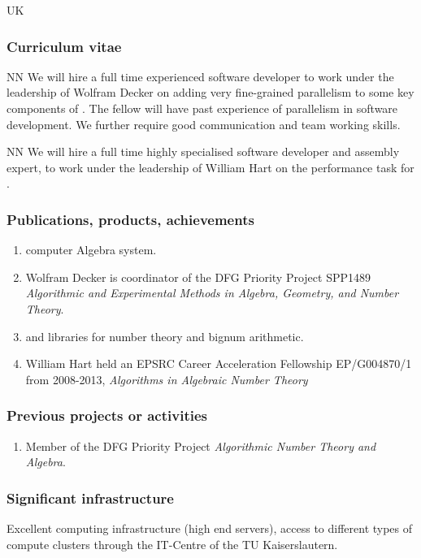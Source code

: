 \begin{sitedescription}{UK}
\subsubsection*{Curriculum vitae}




\begin{participant}[type=res,PM=48]{NN}
We will hire a full time experienced software developer to work
  under the leadership of Wolfram Decker on adding very fine-grained 
  parallelism to some key components of \Singular. The fellow
  will have past experience of parallelism in software development.
  We further require good communication and team working
  skills.
\end{participant}

\begin{participant}[type=res,PM=12]{NN}
  We will hire a full time highly specialised software developer and
  assembly expert, to work under the leadership of William Hart on the
  performance task  for \MPIR.
\end{participant}

\subsubsection*{Publications, products, achievements}

\begin{enumerate}
\item \Singular computer Algebra system.
\item Wolfram Decker is coordinator of the DFG Priority Project SPP1489 \emph{Algorithmic and Experimental Methods in Algebra, Geometry, and
Number Theory}.
\item {} and \MPIR {} libraries for number theory and bignum arithmetic.
\item William Hart held an EPSRC Career Acceleration Fellowship EP/G004870/1 
from 2008-2013, \emph{Algorithms in Algebraic Number Theory}
\end{enumerate}

\subsubsection*{Previous projects or activities}

\begin{enumerate}
\item Member of the DFG Priority Project \emph{Algorithmic Number Theory and Algebra}.
\end{enumerate}

\subsubsection*{Significant infrastructure}

Excellent computing infrastructure (high end servers), access to 
different types of compute clusters through the IT-Centre of the 
TU Kaiserslautern.
\end{sitedescription}



